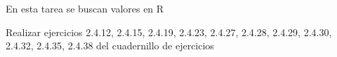 \documentclass{oxmathproblems}
\begin{document}
En esta tarea se buscan valores en R


Realizar ejercicios 2.4.12, 2.4.15, 2.4.19, 2.4.23, 2.4.27, 2.4.28, 2.4.29, 2.4.30, 2.4.32, 2.4.35, 2.4.38 del cuadernillo de ejercicios
\end{document}
